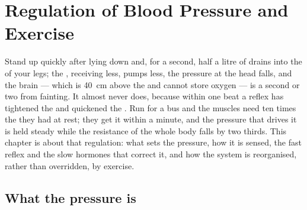 \chapter{Regulation of Blood Pressure and Exercise}\label{ch:b2:blood-pressure}

Stand up quickly after lying down and, for a second, half a litre of
 drains into the  of your legs; the , receiving less,
pumps less, the pressure at the head falls, and the brain --- which
is \qty{40}{cm} above the  and cannot store oxygen --- is a second or
two from fainting. It almost never does, because within one beat a
reflex has tightened the  and quickened the . Run for
a bus and the muscles need ten times the  they had at rest;
they get it within a minute, and the pressure that drives it is
held steady while the resistance of the whole body falls by two
thirds. This chapter is about that regulation: what sets the
pressure, how it is sensed, the fast reflex and the slow hormones
that correct it, and how the system is reorganised, rather than
overridden, by exercise.

\section{What the pressure is}

